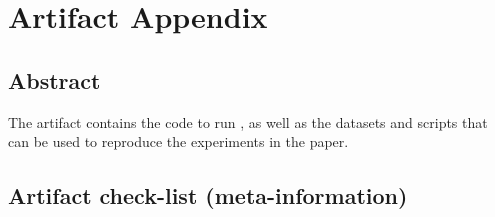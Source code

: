 \section{Artifact Appendix}

\subsection{Abstract}

The artifact contains the code to run \sys, as well as the datasets and scripts that can be used to reproduce the experiments in the paper. 
\subsection{Artifact check-list (meta-information)}


